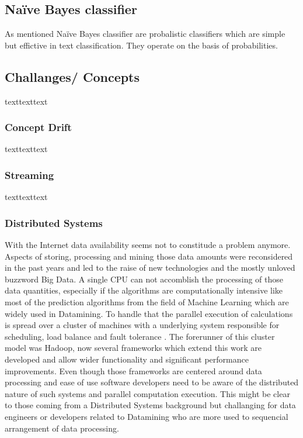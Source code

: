 \documentclass[12pt]{article}
\begin{document}
\subsection{Na\"ive Bayes classifier}

As mentioned Na\"ive Bayes classifier are probalistic classifiers which are simple but effictive in text classification. They operate on the basis of probabilities. 

\subsection{Challanges/ Concepts}
texttexttext

\subsubsection{Concept Drift}
texttexttext

\subsubsection{Streaming}
texttexttext

\subsubsection{Distributed Systems}
With the Internet data availability seems not to constitude a problem anymore. Aspects of storing, processing and mining those data amounts were reconsidered in the past years and led to the raise of new technologies and the mostly unloved buzzword Big Data. A single CPU can not accomblish the processing of those data quantities, especially if the algorithms are computationally intensive like most of the prediction algorithms from the field of Machine Learning which are widely used in Datamining. To handle that  the parallel execution of calculations is spread over a cluster of machines with a underlying system responsible for scheduling, load balance and fault tolerance \citep[p. 10]{zaharia2010} . The forerunner of this cluster model was Hadoop, now several frameworks which extend this work are developed and allow wider functionality and significant performance improvements. Even though those frameworks are centered around data processing and ease of use software developers need to be aware of the distributed nature of such systems and parallel computation execution. This might be clear to those coming from a Distributed Systems background but challanging for data engineers or developers related to Datamining who are more used to sequencial arrangement of data processing.  
\end{document}
